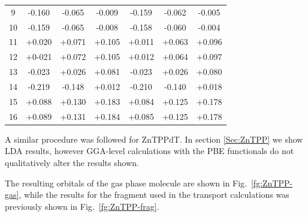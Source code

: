 \documentclass[aip,jcp,a4paper,reprint,floatfix,superscriptaddress]{revtex4-1}
\begin{document}
\begin{table}
{\begin{tabular}{c|ccc|ccc}
 9   & -0.160 & -0.065 & -0.009 & -0.159 & -0.062 & -0.005 \\ 
 10 & -0.159 & -0.065 & -0.008 & -0.158 & -0.060 & -0.004 \\ 
 11 & +0.020 & +0.071 & +0.105 & +0.011 & +0.063 & +0.096 \\ 
 12 & +0-021 & +0.072 & +0.105 & +0.012 & +0.064 & +0.097 \\ 
 13 & -0.023 & +0.026 & +0.081 & -0.023 & +0.026 & +0.080 \\ 
 14 & -0.219 & -0.148 & +0.012 & -0.210 & -0.140 & +0.018 \\ 
 15 & +0.088 & +0.130 & +0.183 & +0.084 & +0.125 & +0.178 \\ 
 16 & +0.089 & +0.131 & +0.184 & +0.085 & +0.125 & +0.178 \\ \hline\hline
\end{tabular}
}
\end{table}

A similar procedure was followed for ZnTPPdT. In section \ref{Sec:ZnTPP} we show LDA results, however GGA-level calculations with the PBE functionals do not qualitatively alter the results shown.

The resulting orbitals of the gas phase molecule are shown in Fig.~\ref{fg:ZnTPP-gas}, while the results for the fragment used in the transport calculations was previously shown in Fig.~\ref{fg:ZnTPP-frag}.
\end{document}
